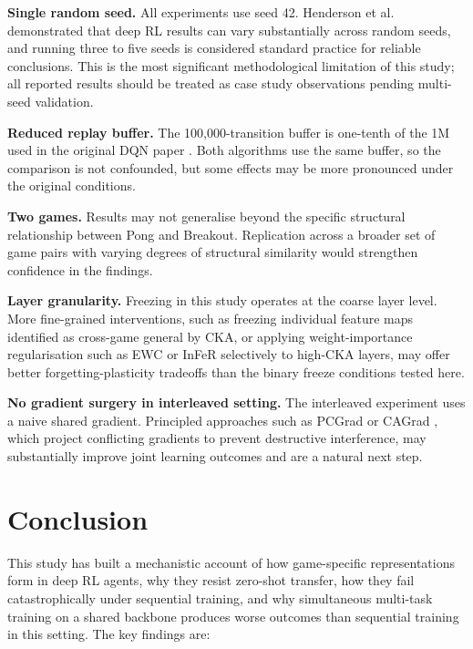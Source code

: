 \documentclass[a4paper]{article}
\begin{document}
\textbf{Single random seed.} All experiments use seed 42. Henderson et al.\
\cite{henderson2018deep} demonstrated that deep RL results can vary substantially across
random seeds, and running three to five seeds is considered standard practice for reliable
conclusions. This is the most significant methodological limitation of this study; all
reported results should be treated as case study observations pending multi-seed
validation.

\textbf{Reduced replay buffer.} The 100,000-transition buffer is one-tenth of the 1M used
in the original DQN paper \cite{mnih2015human}. Both algorithms use the same buffer, so the
comparison is not confounded, but some effects may be more pronounced under the original
conditions.

\textbf{Two games.} Results may not generalise beyond the specific structural relationship
between Pong and Breakout. Replication across a broader set of game pairs with varying
degrees of structural similarity would strengthen confidence in the findings.

\textbf{Layer granularity.} Freezing in this study operates at the coarse layer level.
More fine-grained interventions, such as freezing individual feature maps identified as
cross-game general by CKA, or applying weight-importance regularisation such as EWC
\cite{kirkpatrick2017overcoming} or InFeR \cite{lyle2022understanding} selectively to
high-CKA layers, may offer better forgetting-plasticity tradeoffs than the binary freeze
conditions tested here.

\textbf{No gradient surgery in interleaved setting.} The interleaved experiment uses a
naive shared gradient. Principled approaches such as PCGrad \cite{yu2020pcgrad} or CAGrad
\cite{liu2021cagrad}, which project conflicting gradients to prevent destructive
interference, may substantially improve joint learning outcomes and are a natural next step.

\section{Conclusion}
\label{sec:conclusion}

This study has built a mechanistic account of how game-specific representations form in deep
RL agents, why they resist zero-shot transfer, how they fail catastrophically under
sequential training, and why simultaneous multi-task training on a shared backbone produces
worse outcomes than sequential training in this setting. The key findings are:
\end{document}
